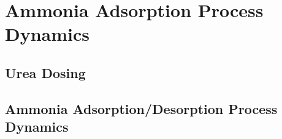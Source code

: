 \section{Ammonia Adsorption Process Dynamics}

\subsection{Urea Dosing}

\subsection{Ammonia Adsorption/Desorption Process Dynamics}
